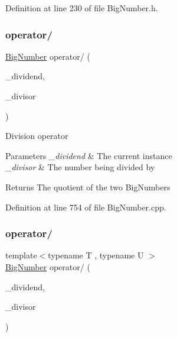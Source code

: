 Definition at line 230 of file Big\+Number.\+h.

\mbox{\label{class_big_nums_1_1_big_number_a1f3bac79755532f059e42f08126001fe}} 
\subsubsection{\texorpdfstring{operator/}{operator/}\hspace{0.1cm}{\footnotesize\ttfamily [1/2]}}
{\footnotesize\ttfamily \mbox{\hyperlink{class_big_nums_1_1_big_number}{Big\+Number}} operator/ (\begin{DoxyParamCaption}\item[{\mbox{\hyperlink{class_big_nums_1_1_big_number}{Big\+Number}}}]{\+\_\+dividend,  }\item[{const \mbox{\hyperlink{class_big_nums_1_1_big_number}{Big\+Number}} \&}]{\+\_\+divisor }\end{DoxyParamCaption})\hspace{0.3cm}{\ttfamily [friend]}}

Division operator 
\begin{DoxyParams}{Parameters}
{\em \+\_\+dividend} & The current instance \\
\hline
{\em \+\_\+divisor} & The number being divided by \\
\hline
\end{DoxyParams}
\begin{DoxyReturn}{Returns}
The quotient of the two Big\+Numbers 
\end{DoxyReturn}


Definition at line 754 of file Big\+Number.\+cpp.

\mbox{\label{class_big_nums_1_1_big_number_a90fc1955ccdc202a1d41857dbe8a81a3}} 
\subsubsection{\texorpdfstring{operator/}{operator/}\hspace{0.1cm}{\footnotesize\ttfamily [2/2]}}
{\footnotesize\ttfamily template$<$typename T , typename U $>$ \\
\mbox{\hyperlink{class_big_nums_1_1_big_number}{Big\+Number}} operator/ (\begin{DoxyParamCaption}\item[{const T \&}]{\+\_\+dividend,  }\item[{const U \&}]{\+\_\+divisor }\end{DoxyParamCaption})\hspace{0.3cm}{\ttfamily [friend]}}



